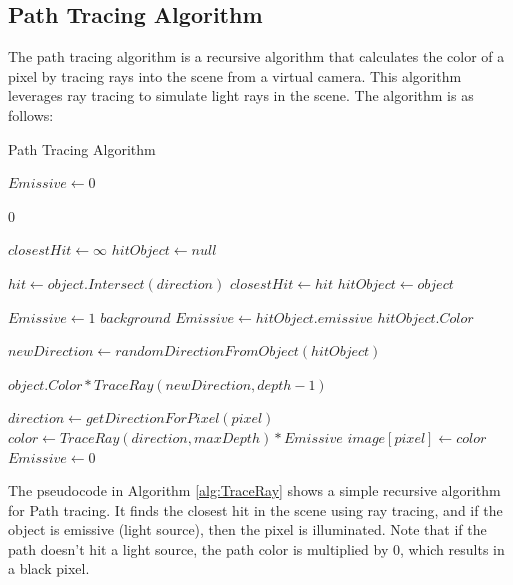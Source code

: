 \documentclass[12pt]{article}
\begin{document}
\subsection{Path Tracing Algorithm}

The path tracing algorithm is a recursive algorithm that calculates the color of a pixel by tracing rays into the scene from a virtual camera.
This algorithm leverages ray tracing to simulate light rays in the scene.
The algorithm is as follows:

\begin{algorithm}[H]
    \caption{Path Tracing Algorithm}
    \label{alg:TraceRay}
    \tiny
    \begin{algorithmic}[0]

        \State $Emissive \gets 0$

        \State \Return $0$ 
        \EndIf

        \State $closestHit \gets \infty$
        \State $hitObject \gets null$

        \State $hit \gets object.Intersect(direction)$
        \State $closestHit \gets hit$
        \State $hitObject \gets object$
        \EndIf
        \EndFor

        \State $Emissive \gets 1$ 
        \State \Return $background$
        \EndIf
        \State $Emissive \gets hitObject.emissive$
         
        \State \Return $hitObject.Color$
        \EndIf

        \State $newDirection \gets randomDirectionFromObject(hitObject)$

        \State \Return $object.Color * TraceRay(newDirection, depth - 1)$

        \EndProcedure

        \State $direction \gets getDirectionForPixel(pixel)$
        \State $color \gets TraceRay(direction, maxDepth) * Emissive$
        \State $image[pixel] \gets color$
        \State $Emissive \gets 0$ 
        \EndFor

    \end{algorithmic}
\end{algorithm}

The pseudocode in Algorithm \ref{alg:TraceRay} shows a simple recursive algorithm for Path tracing.
It finds the closest hit in the scene using ray tracing, and if the object is emissive (light source), then the pixel is illuminated.
Note that if the path doesn't hit a light source, the path color is multiplied by 0, which results in a black pixel.
\end{document}
